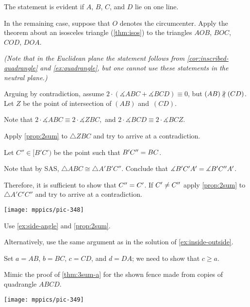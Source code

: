 \begin{multicols}{2}
The statement is evident if $A$, $B$, $C$, and $D$ lie on one line.

In the remaining case, suppose that $O$ denotes the circumcenter.
Apply the theorem about an isosceles triangle (\ref{thm:isos}) to the triangles 
$AOB$,
$BOC$, 
$COD$, 
$DOA$. 

\textit{(Note that in the Euclidean plane the statement follows from \ref{cor:inscribed-quadrangle} and \ref{ex:quadrangle},
but one cannot use these statements in the neutral plane.)}

Arguing by contradiction, 
assume 
$2\cdot(\measuredangle ABC+\measuredangle BCD)\equiv0$, 
but $(AB)\z\nparallel(C D)$.
Let $Z$ be the point of intersection of $(AB)$ and~$(CD)$.

Note that 
$
2\cdot \measuredangle ABC\equiv 2\cdot \measuredangle ZBC,
$ and
$2\cdot \measuredangle BCD\equiv 2\cdot \measuredangle BCZ$.

Apply \ref{prop:2sum} to $\triangle ZBC$ and try to arrive at a contradiction.

Let $C''\in [B'C')$ be the point such that $B'C''\z=BC$.

Note that by SAS, $\triangle ABC\cong \triangle A'B'C''$.
Conclude that $\measuredangle B'C'A'\z= \measuredangle B'C''A'$.

Therefore, it is sufficient to show that $C''\z=C'$.
If $C'\z\ne C''$ apply \ref{prop:2sum} to $\triangle A'C'C''$ and try to arrive at a contradiction.


\begin{Figure}
\vskip-0mm
\centering
\texttt{[image: mppics/pic-348]}
\end{Figure}


Use \ref{ex:side-angle} and \ref{prop:2sum}.

Alternatively, use the same argument as in the solution of \ref{ex:inside-outside}.

Set $a=AB$, $b=BC$, $c=CD$, and $d=DA$; we need to show that $c\ge a$.

Mimic the proof of \ref{thm:3sum-a} for the shown fence made from copies of quadrangle $ABCD$.

\begin{Figure}
\vskip-0mm
\centering
\texttt{[image: mppics/pic-349]}
\end{Figure}


\end{multicols}
